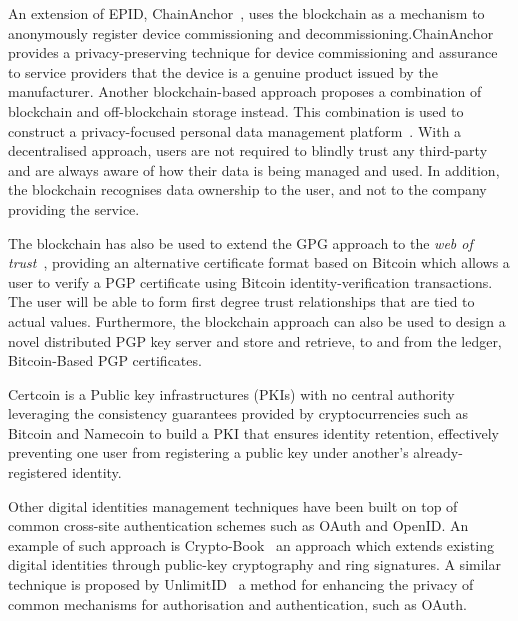 An extension of EPID, ChainAnchor~\cite{hardjono2016cloud}, uses the blockchain as a mechanism to anonymously register device commissioning and  decommissioning.ChainAnchor provides a privacy-preserving technique for device commissioning and assurance to service providers that the device is a genuine product issued by the manufacturer. Another blockchain-based approach proposes a combination of blockchain and off-blockchain storage instead. This combination is used to construct a privacy-focused personal data management platform~\cite{zyskind2015decentralizing}. With a decentralised approach, users are not required to blindly trust any third-party and are always aware of how their data is being managed and used. In addition, the blockchain recognises data ownership to the user, and not to the company providing the service.

The blockchain has also be used to extend the GPG approach to the \emph{web of trust}~\cite{wilson2015pretty, cryptoeprint:2016:469}, providing an alternative certificate format based on Bitcoin which allows a user to verify a PGP certificate using Bitcoin identity-verification transactions. The user will be able to form first degree trust relationships that are tied to actual values. Furthermore, the blockchain approach can also be used to design a novel distributed PGP key server and store and retrieve, to and from the ledger, Bitcoin-Based PGP certificates.  

Certcoin is a Public key infrastructures (PKIs) with no central authority~\cite{fromknecht2014decentralized} leveraging the consistency guarantees provided by cryptocurrencies such as Bitcoin and Namecoin to build a PKI that ensures identity retention, effectively preventing one user from registering a public key under another's already-registered identity.

Other digital identities management techniques have been built on top of common cross-site authentication schemes such as OAuth and OpenID. An example of such approach is Crypto-Book~\cite{maheswaran2013crypto} an approach which extends existing digital identities through public-key cryptography and ring signatures. A similar technique is proposed by UnlimitID~\cite{isaakidis2016unlimitid} a method for enhancing the privacy of common mechanisms for authorisation and authentication, such as OAuth.
